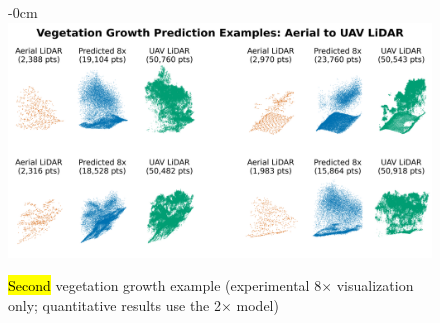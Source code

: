 \documentclass[remotesensing,article,accept,pdftex,moreauthors]{Definitions/mdpi}
\begin{document}
\begin{figure}[H]
\begin{adjustwidth}{-\extralength}{0cm}
    \centering
    \includegraphics[width=0.98\linewidth]{figures/veg_growth2_8x.png}
    \end{adjustwidth}
    \caption{\hl{Second} %
vegetation growth example (experimental 8$\times$ visualization only; quantitative results use the 2$\times$ model) }
    \label{fig:appendix_growth2}
\end{figure}

\vspace{-11pt}

\end{document}
